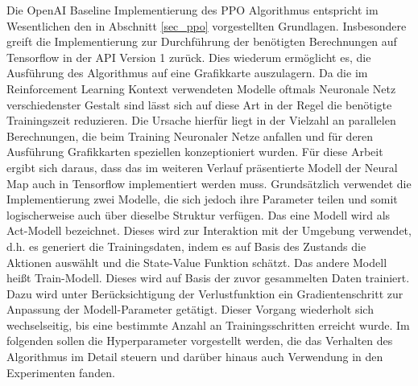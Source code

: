 Die OpenAI Baseline Implementierung des PPO Algorithmus entspricht im Wesentlichen den in Abschnitt \ref{sec_ppo} vorgestellten Grundlagen. Insbesondere greift die Implementierung zur Durchführung der benötigten Berechnungen auf Tensorflow in der API Version 1 zurück. Dies wiederum ermöglicht es, die Ausführung des Algorithmus auf eine Grafikkarte auszulagern. Da die im Reinforcement Learning Kontext verwendeten Modelle oftmals Neuronale Netz verschiedenster Gestalt sind lässt sich auf diese Art in der Regel die benötigte Trainingszeit reduzieren. Die Ursache hierfür liegt in der Vielzahl an parallelen Berechnungen, die beim Training Neuronaler Netze anfallen und für deren Ausführung Grafikkarten speziellen konzeptioniert wurden. Für diese Arbeit ergibt sich daraus, dass das im weiteren Verlauf präsentierte Modell der Neural Map auch in Tensorflow implementiert werden muss. Grundsätzlich verwendet die Implementierung zwei Modelle, die sich jedoch ihre Parameter teilen und somit logischerweise auch über dieselbe Struktur verfügen. Das eine Modell wird als Act-Modell bezeichnet. Dieses wird zur Interaktion mit der Umgebung verwendet, d.h. es generiert die Trainingsdaten, indem es auf Basis des Zustands die Aktionen auswählt und die State-Value Funktion schätzt. Das andere Modell heißt Train-Modell. Dieses wird auf Basis der zuvor gesammelten Daten trainiert. Dazu wird unter Berücksichtigung der Verlustfunktion ein Gradientenschritt zur Anpassung der Modell-Parameter getätigt. Dieser Vorgang wiederholt sich wechselseitig, bis eine bestimmte Anzahl an Trainingsschritten erreicht wurde. Im folgenden sollen die Hyperparameter vorgestellt werden, die das Verhalten des Algorithmus im Detail steuern und darüber hinaus auch Verwendung in den Experimenten fanden.

